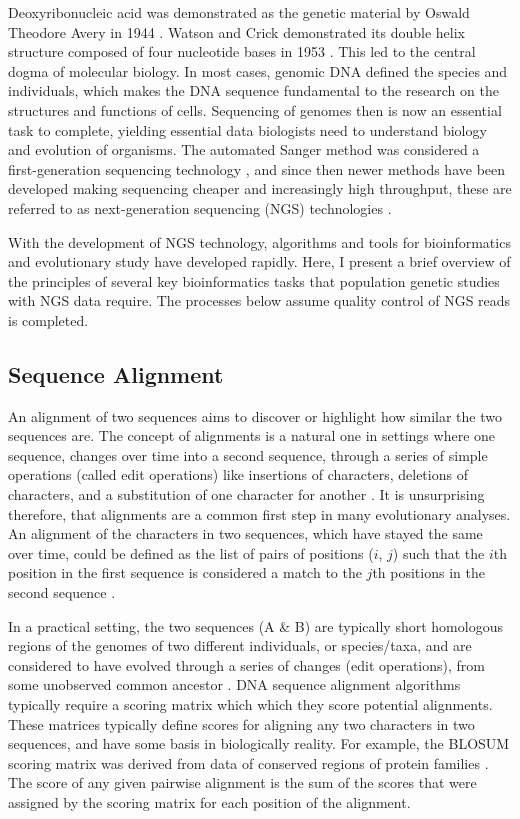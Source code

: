 
Deoxyribonucleic acid was demonstrated as the genetic material by Oswald Theodore Avery in 1944 \parencite{Russell1988}.
Watson and Crick demonstrated its double helix structure composed of four nucleotide bases in 1953 \parencite{Watson1953}.
This led to the central dogma of molecular biology.
In most cases, genomic DNA defined the species and individuals, which makes the DNA sequence fundamental to the research on the structures and functions of cells.
Sequencing of genomes then is now an essential task  to complete, yielding essential data biologists need to understand biology and evolution of organisms.
The automated Sanger method was considered a first-generation sequencing technology \parencite{Sanger1975,Sanger1977}, and since then newer methods have been developed making sequencing cheaper and increasingly high throughput, these are referred to as next-generation sequencing (NGS) technologies \parencite{Goodwin2016}.

With the development of NGS technology, algorithms and tools for bioinformatics and evolutionary study have developed rapidly.
Here, I present a brief overview of the principles of several key bioinformatics tasks that population genetic studies with NGS data require. The processes below assume quality control of NGS reads is completed.


\subsection{Sequence Alignment}

An alignment of two sequences aims to discover or highlight how similar the two sequences are.
The concept of alignments is a natural one in settings where one sequence, changes over time into a second sequence, through a series of simple operations (called edit operations) like insertions of characters, deletions of characters, and a substitution of one character for another \parencite{makinen2015genome}.
It is unsurprising therefore, that alignments are a common first step in many evolutionary analyses. An alignment of the characters in two sequences, which have stayed the same over time, could be defined as the list of pairs of positions ($i$, $j$) such that the $i$th position in the first sequence is considered a match to the $j$th positions in the second sequence \parencite{makinen2015genome}.

In a practical setting, the two sequences (A \& B) are typically short homologous regions of the genomes of two different individuals, or species/taxa, and are considered to have evolved through a series of changes (edit operations), from some unobserved common ancestor \parencite{Lemey2009b}.
DNA sequence alignment algorithms typically require a scoring matrix which which they score potential alignments.
These matrices typically define scores for aligning any two characters in two sequences, and have some basis in biologically reality.
For example, the BLOSUM scoring matrix was derived from data of conserved regions of protein families \parencite{Lemey2009b}. 
The score of any given pairwise alignment is the sum of the scores that were assigned by the scoring matrix for each position of the alignment. 

